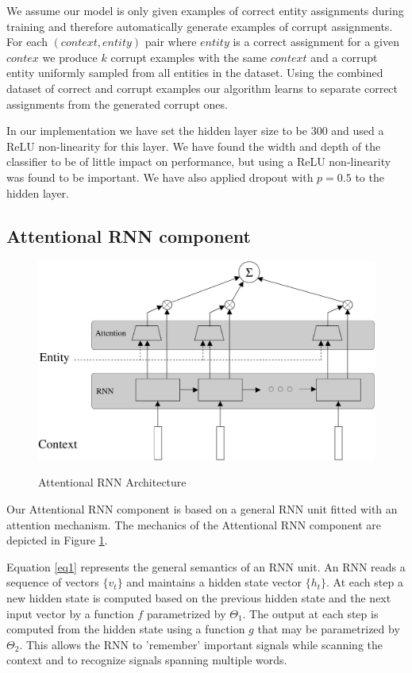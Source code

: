 \documentclass[11pt]{article}
\begin{document}
	We assume our model is only given examples of correct entity assignments during training and therefore automatically generate examples of corrupt assignments. For each $(context,entity)$ pair where $entity$ is a correct assignment for a given $contex$ we produce $k$ corrupt examples with the same $context$ and a corrupt entity uniformly sampled from all entities in the dataset. Using the combined dataset of correct and corrupt examples our algorithm learns to separate correct assignments from the generated corrupt ones.
	
	In our implementation we have set the hidden layer size to be 300 and used a ReLU non-linearity for this layer. We have found the width and depth of the classifier to be of little impact on performance, but using a ReLU non-linearity was found to be important. We have also applied dropout with $p=0.5$ to the hidden layer.
	
	\subsection{Attentional RNN component}
	
	\begin{figure}
		\centering 
		\caption{Attentional RNN Architecture}
		\includegraphics[scale=0.25]{diagrams/RNN_ATTN.pdf}
		\label{fig:arnn}
	\end{figure}	
	
	Our Attentional RNN component is based on a general RNN unit fitted with an attention mechanism. The mechanics of the Attentional RNN component are depicted in Figure \ref{fig:arnn}. 
		
	Equation \ref{eq1} represents the general semantics of an RNN unit. An RNN reads a sequence of vectors $\{v_t\}$ and maintains a hidden state vector $\{h_t\}$. At each step a new hidden state is computed based on the previous hidden state and the next input vector by a function $f$ parametrized by $\Theta_1$. The output at each step is computed from the hidden state using a function $g$ that may be parametrized by $\Theta_2$. This allows the RNN to 'remember' important signals while scanning the context and to recognize signals spanning multiple words.
	
\end{document}
